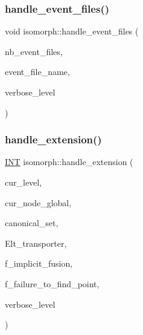\subsubsection{\texorpdfstring{handle\+\_\+event\+\_\+files()}{handle\_event\_files()}}
{\footnotesize\ttfamily void isomorph\+::handle\+\_\+event\+\_\+files (\begin{DoxyParamCaption}\item[{\mbox{\hyperlink{galois_8h_a09fddde158a3a20bd2dcadb609de11dc}{I\+NT}}}]{nb\+\_\+event\+\_\+files,  }\item[{const \mbox{\hyperlink{galois_8h_ab6cc7b4aeb6ea31aba2b3fbfc83ff5e6}{B\+Y\+TE}} $\ast$$\ast$}]{event\+\_\+file\+\_\+name,  }\item[{\mbox{\hyperlink{galois_8h_a09fddde158a3a20bd2dcadb609de11dc}{I\+NT}}}]{verbose\+\_\+level }\end{DoxyParamCaption})}

\mbox{\label{classisomorph_add6e954f5b8fdcbd11c4743afb44531b}} 
\subsubsection{\texorpdfstring{handle\+\_\+extension()}{handle\_extension()}}
{\footnotesize\ttfamily \mbox{\hyperlink{galois_8h_a09fddde158a3a20bd2dcadb609de11dc}{I\+NT}} isomorph\+::handle\+\_\+extension (\begin{DoxyParamCaption}\item[{\mbox{\hyperlink{galois_8h_a09fddde158a3a20bd2dcadb609de11dc}{I\+NT}}}]{cur\+\_\+level,  }\item[{\mbox{\hyperlink{galois_8h_a09fddde158a3a20bd2dcadb609de11dc}{I\+NT}}}]{cur\+\_\+node\+\_\+global,  }\item[{\mbox{\hyperlink{galois_8h_a09fddde158a3a20bd2dcadb609de11dc}{I\+NT}} $\ast$}]{canonical\+\_\+set,  }\item[{\mbox{\hyperlink{galois_8h_a09fddde158a3a20bd2dcadb609de11dc}{I\+NT}} $\ast$}]{Elt\+\_\+transporter,  }\item[{\mbox{\hyperlink{galois_8h_a09fddde158a3a20bd2dcadb609de11dc}{I\+NT}}}]{f\+\_\+implicit\+\_\+fusion,  }\item[{\mbox{\hyperlink{galois_8h_a09fddde158a3a20bd2dcadb609de11dc}{I\+NT}} \&}]{f\+\_\+failure\+\_\+to\+\_\+find\+\_\+point,  }\item[{\mbox{\hyperlink{galois_8h_a09fddde158a3a20bd2dcadb609de11dc}{I\+NT}}}]{verbose\+\_\+level }\end{DoxyParamCaption})}

